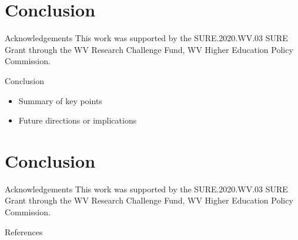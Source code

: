 \documentclass{beamer}
\newtheorem{conjecture}{Conjecture}
\begin{document}

\section{Conclusion}
\begin{frame}{Acknowledgements}
    This work was supported by the SURE.2020.WV.03 SURE Grant through the WV Research Challenge Fund, WV Higher Education Policy Commission.
\end{frame}

\begin{frame}{Conclusion}
  \begin{itemize}
    \item Summary of key points
    \item Future directions or implications
  \end{itemize}
\end{frame}

\section{Conclusion}
\begin{frame}{Acknowledgements}
    This work was supported by the SURE.2020.WV.03 SURE Grant through the WV Research Challenge Fund, WV Higher Education Policy Commission.
\end{frame}


\begin{frame}{References}
  
    \printbibliography

\end{frame}
\end{document}
